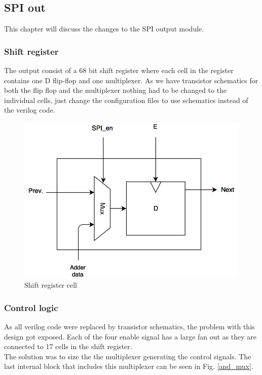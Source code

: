 
 \newpage
\subsection{SPI out}
This chapter will discuss the changes to the SPI output module.


\subsubsection{Shift register}
The output consist of a 68 bit shift register where each cell in the register contains one D flip-flop and one multiplexer. As we have transistor schematics for both the flip flop and the multiplexer nothing had to be changed to the individual cells, just change the configuration files to use schematics instead of the verilog code. 

\begin{figure}[H]
\centering
\captionsetup{justification=centering}
\includegraphics[scale=0.35]{../figures/MUX_DFF.png}
\caption{Shift register cell}
\label{mux_dff}
\end{figure}

 


\newpage

\subsubsection{Control logic}
As all verilog code were replaced by transistor schematics, the problem with this design got exposed. Each of the four enable signal has a large fan out as they are connected to 17 cells in the shift register. \\
The solution was to size the the multiplexer generating the control signals. The last internal block that includes this multiplexer can be seen in Fig. \ref{and_mux}. 


